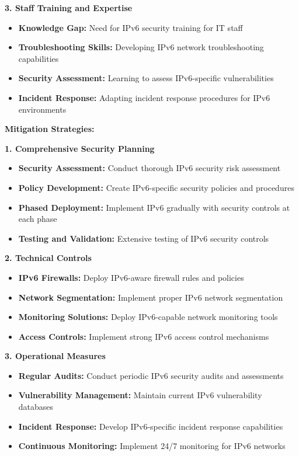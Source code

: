 \documentclass[12pt,a4paper]{article}
\begin{document}
\textbf{3. Staff Training and Expertise}
\begin{itemize}
    \item \textbf{Knowledge Gap:} Need for IPv6 security training for IT staff
    \item \textbf{Troubleshooting Skills:} Developing IPv6 network troubleshooting capabilities
    \item \textbf{Security Assessment:} Learning to assess IPv6-specific vulnerabilities
    \item \textbf{Incident Response:} Adapting incident response procedures for IPv6 environments
\end{itemize}

\textbf{Mitigation Strategies:}

\textbf{1. Comprehensive Security Planning}
\begin{itemize}
    \item \textbf{Security Assessment:} Conduct thorough IPv6 security risk assessment
    \item \textbf{Policy Development:} Create IPv6-specific security policies and procedures
    \item \textbf{Phased Deployment:} Implement IPv6 gradually with security controls at each phase
    \item \textbf{Testing and Validation:} Extensive testing of IPv6 security controls
\end{itemize}

\textbf{2. Technical Controls}
\begin{itemize}
    \item \textbf{IPv6 Firewalls:} Deploy IPv6-aware firewall rules and policies
    \item \textbf{Network Segmentation:} Implement proper IPv6 network segmentation
    \item \textbf{Monitoring Solutions:} Deploy IPv6-capable network monitoring tools
    \item \textbf{Access Controls:} Implement strong IPv6 access control mechanisms
\end{itemize}

\textbf{3. Operational Measures}
\begin{itemize}
    \item \textbf{Regular Audits:} Conduct periodic IPv6 security audits and assessments
    \item \textbf{Vulnerability Management:} Maintain current IPv6 vulnerability databases
    \item \textbf{Incident Response:} Develop IPv6-specific incident response capabilities
    \item \textbf{Continuous Monitoring:} Implement 24/7 monitoring for IPv6 networks
\end{itemize}
\end{document}

